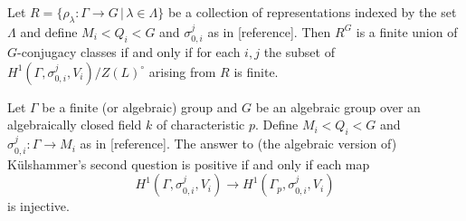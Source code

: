 \begin{theorem}
  Let $R=\{\rho_\lambda:\Gamma\rightarrow G\,|\,\lambda \in \Lambda\}$ be a collection of representations indexed by the set $\Lambda$ and define $M_i < Q_i < G$ and $\sigma_{0,i}^{j}$ as in [reference]. Then $R^{G}$ is a finite union of $G$-conjugacy classes if and only if for each $i,j$ the subset of $H^{1}(\Gamma, \sigma_{0,i}^{j}, V_{i})/Z(L)^\circ$ arising from $R$ is finite.
  \label{thm:g_h1}
\end{theorem}

\begin{theorem}
  Let $\Gamma$ be a finite (or algebraic) group and $G$ be an algebraic group over an algebraically closed field $k$ of characteristic $p$. Define $M_i < Q_i < G$ and $\sigma_{0,i}^{j}:\Gamma \rightarrow M_{i}$ as in [reference]. The answer to (the algebraic version of) K\"ulshammer's second question is positive if and only if each map
  \begin{displaymath}
    H^{1}(\Gamma, \sigma_{0,i}^{j}, V_{i}) \rightarrow H^{1}(\Gamma_{p}, \sigma_{0,i}^{j}, V_{i})
  \end{displaymath}
  is injective.
  \label{k2_h1}
\end{theorem}

